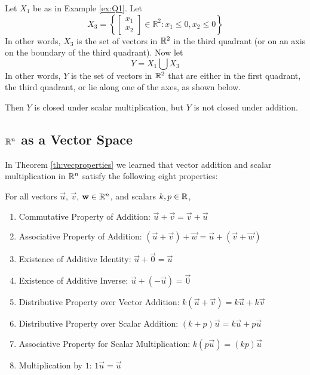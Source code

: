 \documentclass{ximera}
\begin{document}
\begin{example} \label{ex:Q1-3}
Let $X_1$ be as in Example \ref{ex:Q1}.  Let $$X_3=\left\{\begin{bmatrix} x_1\\x_2\end{bmatrix} \in \mathbb{R}^2 : x_1 \le 0, x_2 \le 0 \right\}$$
In other words, $X_3$ is the set of vectors in $\mathbb{R}^2$ in the third quadrant (or on an axis on the boundary of the third quadrant).  Now let 
$$Y = X_1 \bigcup X_3$$ 
In other words, $Y$ is the set of vectors in $\mathbb{R}^2$ that are either in the first quadrant, the third quadrant, or lie along one of the axes, as shown below.

\begin{center}
\end{center}
Then $Y$ is closed under scalar multiplication, but $Y$ is not closed under addition.
\end{example}

\subsection*{$\mathbb{R}^n$ as a Vector Space}

In Theorem \ref{th:vecproperties} we learned that vector addition and scalar multiplication in $\mathbb{R}^n$ satisfy the following eight properties:

For all vectors $\vec{u}$, $\vec{v}$, $\mathbf{w}\in\mathbb{R}^n$, and scalars $k, p\in\mathbb{R}$,
\begin{enumerate}
 \item 
  Commutative Property of Addition:\quad
  $\vec{u}+\vec{v}=\vec{v}+\vec{u}$
  \item 
  Associative Property of Addition:\quad
  $(\vec{u}+\vec{v})+\vec{w}=\vec{u}+(\vec{v}+\vec{w})$
  \item 
  Existence of Additive Identity:\quad
  $\vec{u}+\vec{0}=\vec{u}$
  \item 
  Existence of Additive Inverse:\quad
  $\vec{u}+(-\vec{u})=\vec{0}$
  \item
  Distributive Property over Vector Addition:\quad
  $k(\vec{u}+\vec{v})=k\vec{u}+k\vec{v}$
  \item
  Distributive Property over Scalar Addition:\quad
  $(k+p)\vec{u}=k\vec{u}+p\vec{u}$
  \item 
  Associative Property for Scalar Multiplication:\quad
  $k(p\vec{u})=(kp)\vec{u}$
  \item 
  Multiplication by $1$:\quad
  $1\vec{u}=\vec{u}$
  \end{enumerate}
\end{document}
